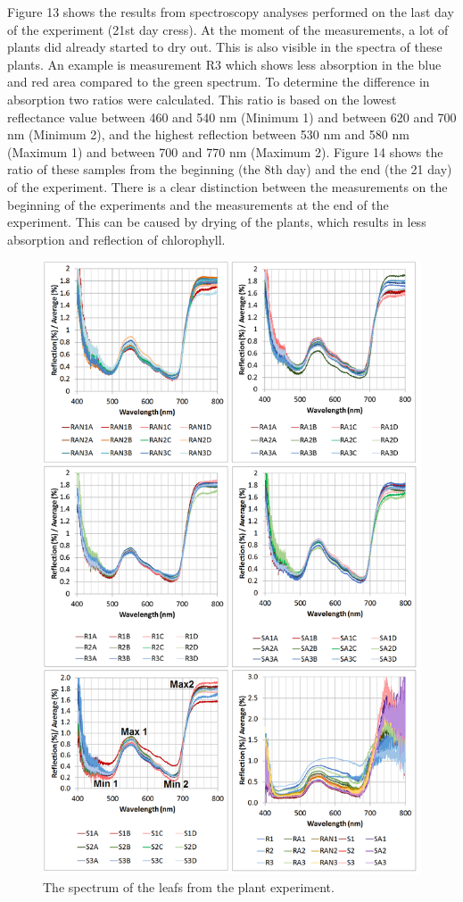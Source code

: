 \documentclass[preprint]{elsarticle}
\begin{document}
Figure 13 shows the results from spectroscopy analyses performed on the last day of the experiment (21st day cress). At the moment of the measurements, a lot of plants did already started to dry out. This is also visible in the spectra of these plants. An example is measurement R3 which shows less absorption in the blue and red area compared to the green spectrum. To determine the difference in absorption two ratios were calculated. This ratio is based on the lowest reflectance value between 460 and 540 nm (Minimum 1) and between 620 and 700 nm (Minimum 2), and the highest reflection between 530 nm and 580 nm (Maximum 1) and between 700 and 770 nm (Maximum 2). Figure 14 shows the ratio of these samples from the beginning (the 8th day) and the end (the 21 day) of the experiment. There is a clear distinction between the measurements on the beginning of the experiments and the measurements at the end of the experiment. This can be caused by drying of the plants, which results in less absorption and reflection of chlorophyll.

\begin{figure}
\centering
\includegraphics{img/figure13.png}
\caption{The spectrum of the leafs from the plant experiment.}
\end{figure}
\end{document}
